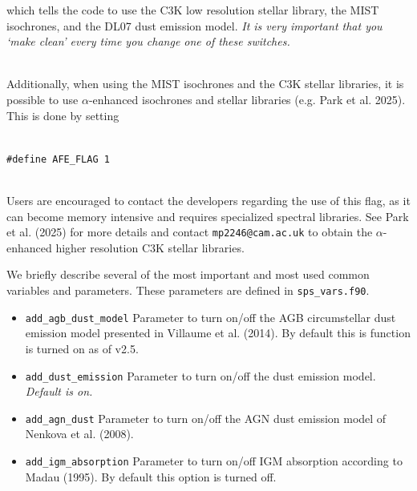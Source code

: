 \documentclass[]{article}
\begin{document}
\noindent
which tells the code to use the C3K low resolution stellar library, the MIST
isochrones, and the DL07 dust emission model. {\it  It is very important that
you `make clean' every time you change one of these switches.}

\noindent\\
\noindent
Additionally, when using the MIST isochrones and the C3K stellar libraries, it
is possible to use $\alpha$-enhanced isochrones and stellar libraries (e.g. Park
et al. 2025). This is done by setting

\noindent\\
\noindent
\texttt{\#define AFE\_FLAG 1}

\noindent\\
\noindent
Users are encouraged to contact the developers regarding the use of this flag,
as it can become memory intensive and requires specialized spectral libraries.
See Park et al. (2025) for more details and contact \texttt{mp2246@cam.ac.uk}
to obtain the $\alpha$-enhanced higher resolution C3K stellar libraries.

\vspace{0.2in}
\vspace{0.1in}

\noindent
We briefly describe several of the most important and most used common
variables and parameters.  These parameters are defined in
\texttt{sps\_vars.f90}.

\begin{itemize}
\item \texttt{add\_agb\_dust\_model}
Parameter to turn on/off the AGB circumstellar dust emission model presented in
Villaume et al. (2014).  By default this is function is turned on as of v2.5.
\end{itemize}

\begin{itemize}
\item \texttt{add\_dust\_emission}
Parameter to turn on/off the dust emission model.
{\it Default is on.}
\end{itemize}

\begin{itemize}
\item \texttt{add\_agn\_dust}
Parameter to turn on/off the AGN dust emission model of Nenkova et al. (2008).
\end{itemize}

\begin{itemize}
\item \texttt{add\_igm\_absorption}
Parameter to turn on/off IGM absorption according to Madau (1995). By default
this option is turned off.
\end{itemize}
\end{document}
